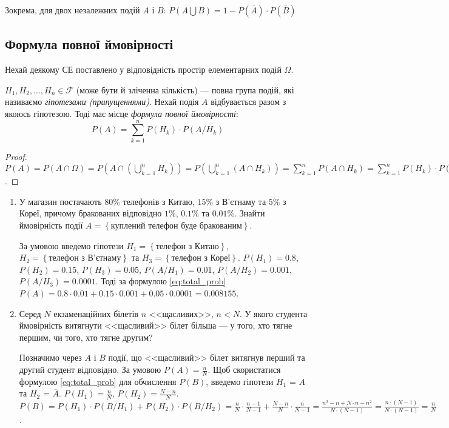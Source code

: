 \noindent Зокрема, для двох незалежних подій $A$ і $B$: $P(A\bigcup B) = 1 - P(\overline{A}) \cdot P(\overline{B})$

\subsection{Формула повної ймовірності}
Нехай деякому СЕ поставлено у відповідність простір елементарних подій $\Omega$.

$H_1, H_2, ..., H_n \in \mathcal{F}$ (може бути й зліченна кількість) --- повна група подій,
які називаємо \emph{гіпотезами (припущеннями)}.
Нехай подія $A$ відбувається разом з якоюсь гіпотезою. Тоді має місце
\emph{формула повної ймовірності}:
\begin{equation}\label{eq:total_prob}
    P\left( A \right) = \sum\limits_{k=1}^n P(H_k)\cdot P(A/H_k)
\end{equation}
\begin{proof}
    $P(A) = P(A \cap \Omega) = P\left(A \cap \left(\bigcup\limits_{k=1}^n H_k\right)\right) = P\left(\bigcup\limits_{k=1}^n (A\cap H_k)\right) = \sum\limits_{k=1}^n P(A\cap H_k) = \sum\limits_{k=1}^n P(H_k)\cdot P(A/H_k)$.
\end{proof}

\begin{example}
    \begin{enumerate}
        \item У магазин постачають $80\%$ телефонів з Китаю, $15\%$ з В'єтнаму та $5\%$ з Кореї,
        причому бракованих відповідно $1\%$, $0.1\%$ та $0.01\%$.
        Знайти ймовірність події $A = \left\{ \text{куплений телефон буде бракованим}\right\}$.

        За умовою введемо гіпотези $H_1 = \left\{ \text{телефон з Китаю}\right\}$,
        $H_2 = \left\{ \text{телефон з В'єтнаму}\right\}$ та $H_3 = \left\{ \text{телефон з Кореї}\right\}$.
        $P(H_1) = 0.8$, $P(H_2) = 0.15$, $P(H_3) = 0.05$,
        $P(A/H_1) = 0.01$, $P(A/H_2) = 0.001$, $P(A/H_3) = 0.0001$.
        Тоді за формулою \eqref{eq:total_prob} $P(A) = 0.8\cdot 0.01 + 0.15\cdot 0.001 + 0.05\cdot 0.0001 = 0.008155$.
        \item Серед $N$ екзаменаційних білетів $n$ <<щасливих>>, $n<N$.
        У якого студента ймовірність витягнути <<щасливий>> білет більша --- у того, хто тягне першим, чи того, хто тягне другим?

        Позначимо через $A$ і $B$ події, що <<щасливий>> білет витягнув перший та другий студент відповідно. За умовою $P(A) = \frac{n}{N}$.
        Щоб скористатися формулою \eqref{eq:total_prob} для обчислення $P(B)$, введемо гіпотези $H_1$ = $A$ та $H_2$ = $\overline{A}$.
        $P(H_1) = \frac{n}{N}$, $P(H_2) = \frac{N-n}{N}$.
        \\ $P(B) = P(H_1)\cdot P(B/H_1) + P(H_2)\cdot P(B/H_2) = \frac{n}{N}\cdot \frac{n-1}{N-1} + \frac{N-n}{N}\cdot \frac{n}{N-1} = 
        \frac{n^2 - n + N\cdot n - n^2}{N\cdot(N-1)} = \frac{n\cdot (N-1)}{N\cdot(N-1)} = \frac{n}{N}$.
    \end{enumerate}
\end{example}

